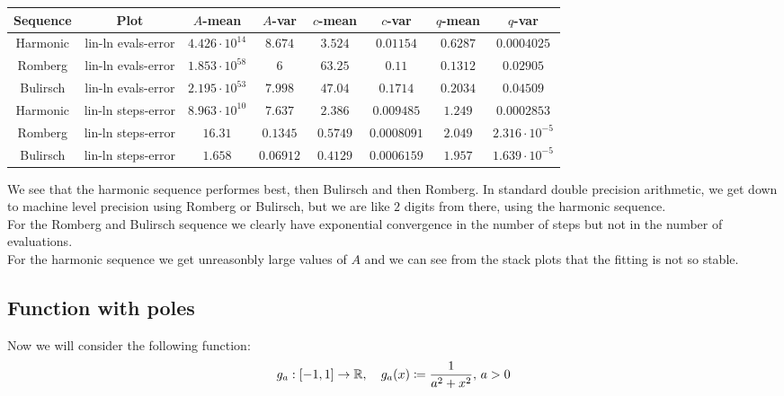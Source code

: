 \begin{table}[H]
    \centering
    \small
    \begin{tabular}{c|c||c|c|c|c|c	|c}
Sequence & Plot & \(A\)-mean & \(A\)-var & \(c\)-mean & \(c\)-var & \(q\)-mean & \(q\)-var\\\hline
\rowcolor{yellow}
Harmonic & lin-ln evals-error & \(4.426\cdot 10^{14}\) & \(8.674\) & \(3.524\) & \(0.01154\) & \(0.6287\) & \(0.0004025\) \\
\rowcolor{red}
Romberg & lin-ln evals-error & \(1.853\cdot 10^{58}\) & \(6\) & \(63.25\) & \(0.11\) & \(0.1312\) & \(0.02905\) \\
\rowcolor{red}
Bulirsch & lin-ln evals-error & \(2.195\cdot 10^{53}\) & \(7.998\) & \(47.04\) & \(0.1714\) & \(0.2034\) & \(0.04509\) \\
\rowcolor{yellow}
Harmonic & lin-ln steps-error & \(8.963\cdot 10^{10}\) & \(7.637\) & \(2.386\) & \(0.009485\) & \(1.249\) & \(0.0002853\) \\
\rowcolor{green}
Romberg & lin-ln steps-error & \(16.31\) & \(0.1345\) & \(0.5749\) & \(0.0008091\) & \(2.049\) & \(2.316\cdot 10^{-5}\) \\
\rowcolor{green}
Bulirsch & lin-ln steps-error & \(1.658\) & \(0.06912\) & \(0.4129\) & \(0.0006159\) & \(1.957\) & \(1.639\cdot 10^{-5}\) \\
    \end{tabular}
    \label{tab:my_label}
\end{table}

We see that the harmonic sequence performes best, then Bulirsch and then Romberg. In standard double precision arithmetic, we get down to machine level precision using Romberg or Bulirsch, but we are like \(2\) digits from there, using the harmonic sequence.\\

For the Romberg and Bulirsch sequence we clearly have exponential convergence in the number of steps but not in the number of evaluations.\\

For the harmonic sequence we get unreasonbly large values of \(A\) and we can see from the stack plots that the fitting is not so stable.\\

\subsection{Function with poles}

Now we will consider the following function:
\[
g_a: [-1, 1] \rightarrow \mathbb{R}, \quad g_a(x) \coloneqq \frac{1}{a^2 + x^2},\, a > 0
\]

